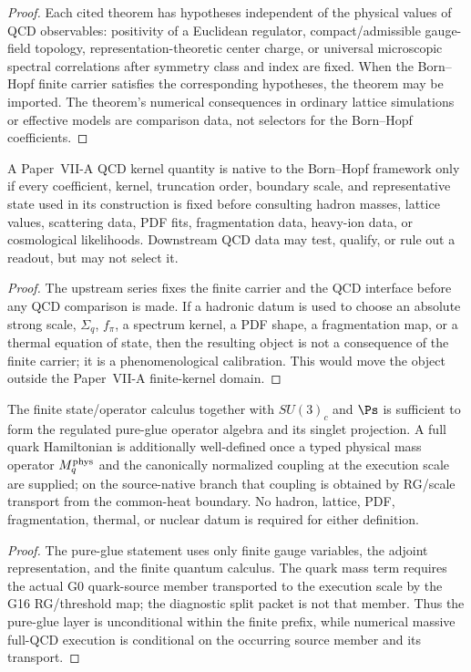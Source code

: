 \documentclass[12pt,a4paper]{article}
\begin{document}
\begin{proof}
Each cited theorem has hypotheses independent of the physical values of QCD observables: positivity of a Euclidean regulator, compact/admissible gauge-field topology, representation-theoretic center charge, or universal microscopic spectral correlations after symmetry class and index are fixed.  When the Born--Hopf finite carrier satisfies the corresponding hypotheses, the theorem may be imported.  The theorem's numerical consequences in ordinary lattice simulations or effective models are comparison data, not selectors for the Born--Hopf coefficients.\qedhere
\end{proof}


\begin{theorem}
\label{p10:thm:qcd-readout-chronology}
A Paper~VII-A QCD kernel quantity is native to the Born--Hopf framework only if every coefficient, kernel, truncation order, boundary scale, and representative state used in its construction is fixed before consulting hadron masses, lattice values, scattering data, PDF fits, fragmentation data, heavy-ion data, or cosmological likelihoods.  Downstream QCD data may test, qualify, or rule out a readout, but may not select it.
\end{theorem}
\begin{proof}
The upstream series fixes the finite carrier and the QCD interface before any QCD comparison is made.  If a hadronic datum is used to choose an absolute strong scale, \(\Sigma_q\), \(f_\pi\), a spectrum kernel, a PDF shape, a fragmentation map, or a thermal equation of state, then the resulting object is not a consequence of the finite carrier; it is a phenomenological calibration.  This would move the object outside the Paper~VII-A finite-kernel domain.\qedhere
\end{proof}

\begin{theorem}
\label{p10:thm:finite-qcd-operator-layer-inherited}
The finite state/operator calculus together with \(SU(3)_c\) and \(\Ps\) is sufficient to form the regulated pure-glue operator algebra and its singlet projection.  A full quark Hamiltonian is additionally well-defined once a typed physical mass operator \(M_q^{\rm phys}\) and the canonically normalized coupling at the execution scale are supplied; on the source-native branch that coupling is obtained by RG/scale transport from the common-heat boundary.  No hadron, lattice, PDF, fragmentation, thermal, or nuclear datum is required for either definition.
\end{theorem}
\begin{proof}
The pure-glue statement uses only finite gauge variables, the adjoint representation, and the finite quantum calculus.  The quark mass term requires the actual G0 quark-source member transported to the execution scale by the G16 RG/threshold map; the diagnostic split packet is not that member.  Thus the pure-glue layer is unconditional within the finite prefix, while numerical massive full-QCD execution is conditional on the occurring source member and its transport.
\end{proof}
\end{document}
